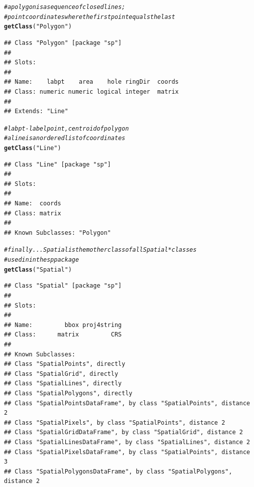 \documentclass{article}\usepackage[]{graphicx}\usepackage[]{color}
\makeatletter
\newcommand{\hlstr}[1]{\textcolor[rgb]{0.192,0.494,0.8}{#1}}%
\newcommand{\hlcom}[1]{\textcolor[rgb]{0.678,0.584,0.686}{\textit{#1}}}%
\newcommand{\hlstd}[1]{\textcolor[rgb]{0.345,0.345,0.345}{#1}}%
\newcommand{\hlkwd}[1]{\textcolor[rgb]{0.737,0.353,0.396}{\textbf{#1}}}%
\newenvironment{kframe}{%
 \def\at@end@of@kframe{}%
 \ifinner\ifhmode%
  \def\at@end@of@kframe{\end{minipage}}%
  \begin{minipage}{\columnwidth}%
 \fi\fi%
 \def\FrameCommand##1{\hskip\@totalleftmargin \hskip-\fboxsep
 \colorbox{shadecolor}{##1}\hskip-\fboxsep
     \hskip-\linewidth \hskip-\@totalleftmargin \hskip\columnwidth}%
 \MakeFramed {\advance\hsize-\width
   \@totalleftmargin\z@ \linewidth\hsize
   \@setminipage}}%
 {\par\unskip\endMakeFramed%
 \at@end@of@kframe}
\newenvironment{knitrout}{}{} %
\makeatother
\begin{document}
\begin{knitrout}
\color{fgcolor}\begin{kframe}
\begin{alltt}
\hlcom{# a polygon is a sequence of closed lines;}
\hlcom{# point coordinates where the first point equals the last }
\hlkwd{getClass}\hlstd{(}\hlstr{"Polygon"}\hlstd{)}
\end{alltt}
\begin{verbatim}
## Class "Polygon" [package "sp"]
## 
## Slots:
##                                               
## Name:    labpt    area    hole ringDir  coords
## Class: numeric numeric logical integer  matrix
## 
## Extends: "Line"
\end{verbatim}
\begin{alltt}
\hlcom{#labpt - label point, centroid of polygon}
\hlcom{# a line is an ordered list of coordinates}
\hlkwd{getClass}\hlstd{(}\hlstr{"Line"}\hlstd{)}
\end{alltt}
\begin{verbatim}
## Class "Line" [package "sp"]
## 
## Slots:
##              
## Name:  coords
## Class: matrix
## 
## Known Subclasses: "Polygon"
\end{verbatim}
\end{kframe}
\end{knitrout}

\begin{knitrout}
\color{fgcolor}\begin{kframe}
\begin{alltt}
\hlcom{#finally... Spatial is the mother class of all Spatial* classes }
\hlcom{# used in in the sp package}
\hlkwd{getClass}\hlstd{(}\hlstr{"Spatial"}\hlstd{)}
\end{alltt}
\begin{verbatim}
## Class "Spatial" [package "sp"]
## 
## Slots:
##                               
## Name:         bbox proj4string
## Class:      matrix         CRS
## 
## Known Subclasses: 
## Class "SpatialPoints", directly
## Class "SpatialGrid", directly
## Class "SpatialLines", directly
## Class "SpatialPolygons", directly
## Class "SpatialPointsDataFrame", by class "SpatialPoints", distance 2
## Class "SpatialPixels", by class "SpatialPoints", distance 2
## Class "SpatialGridDataFrame", by class "SpatialGrid", distance 2
## Class "SpatialLinesDataFrame", by class "SpatialLines", distance 2
## Class "SpatialPixelsDataFrame", by class "SpatialPoints", distance 3
## Class "SpatialPolygonsDataFrame", by class "SpatialPolygons", distance 2
\end{verbatim}
\end{kframe}
\end{knitrout}
\end{document}
